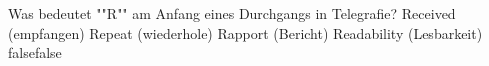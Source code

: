     {Was bedeutet ""R"" am Anfang eines Durchgangs in Telegrafie?}
    {Received (empfangen)}
    {Repeat (wiederhole)}
    {Rapport (Bericht)}
    {Readability (Lesbarkeit)}
    {false}{false}